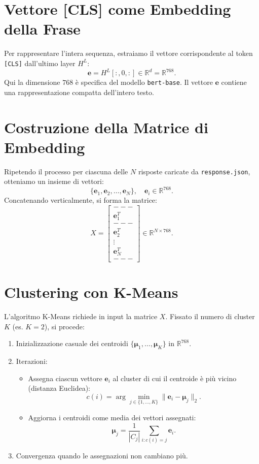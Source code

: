 \documentclass[a4paper,11pt]{article}
\begin{document}
\section{Vettore [CLS] come Embedding della Frase}
Per rappresentare l'intera sequenza, estraiamo il vettore corrispondente al token \texttt{[CLS]} dall'ultimo layer $H^L$:
\[
\mathbf{e} = H^L[:, 0, :] \in \mathbb{R}^{d} = \mathbb{R}^{768}.
\]
Qui la dimensione $768$ è specifica del modello \texttt{bert-base}. Il vettore $\mathbf{e}$ contiene una rappresentazione compatta dell'intero testo.

\section{Costruzione della Matrice di Embedding}
Ripetendo il processo per ciascuna delle $N$ risposte caricate da \texttt{response.json}, otteniamo un insieme di vettori:
\[
\{\mathbf{e}_1, \mathbf{e}_2, \dots, \mathbf{e}_N\},\quad \mathbf{e}_i \in \mathbb{R}^{768}.
\]
Concatenando verticalmente, si forma la matrice:
\[
X = \begin{bmatrix}
--- \\
\mathbf{e}_1^T \\
--- \\
\mathbf{e}_2^T \\
\vdots \\
\mathbf{e}_N^T \\
---
\end{bmatrix} \in \mathbb{R}^{N \times 768}.
\]

\section{Clustering con K-Means}
L'algoritmo K-Means richiede in input la matrice $X$. Fissato il numero di cluster $K$ (es. $K=2$), si procede:
\begin{enumerate}
  \item Inizializzazione casuale dei centroidi $\{\boldsymbol{\mu}_1, \dots, \boldsymbol{\mu}_K\}$ in $\mathbb{R}^{768}$.
  \item Iterazioni:
    \begin{itemize}
      \item Assegna ciascun vettore $\mathbf{e}_i$ al cluster di cui il centroide è più vicino (distanza Euclidea):
      \[
      c(i) = \arg\min_{j \in \{1,\dots,K\}} \|\mathbf{e}_i - \boldsymbol{\mu}_j\|_2.
      \]
      \item Aggiorna i centroidi come media dei vettori assegnati:
      \[
      \boldsymbol{\mu}_j = \frac{1}{|C_j|} \sum_{i: c(i)=j} \mathbf{e}_i.
      \]
    \end{itemize}
  \item Convergenza quando le assegnazioni non cambiano più.
\end{enumerate}
\end{document}
